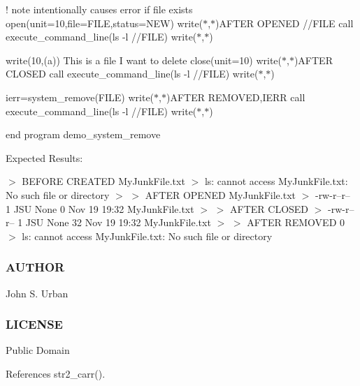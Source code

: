 ! note intentionally causes error if file exists open(unit=10,file=F\+I\+LE,status=\textquotesingle{}N\+EW\textquotesingle{}) write($\ast$,$\ast$)\textquotesingle{}A\+F\+T\+ER O\+P\+E\+N\+ED \textquotesingle{}//\+F\+I\+LE call execute\+\_\+command\+\_\+line(\textquotesingle{}ls -\/l \textquotesingle{}//\+F\+I\+LE) write($\ast$,$\ast$)

write(10,\textquotesingle{}(a)\textquotesingle{}) \textquotesingle{}This is a file I want to delete\textquotesingle{} close(unit=10) write($\ast$,$\ast$)\textquotesingle{}A\+F\+T\+ER C\+L\+O\+S\+ED \textquotesingle{} call execute\+\_\+command\+\_\+line(\textquotesingle{}ls -\/l \textquotesingle{}//\+F\+I\+LE) write($\ast$,$\ast$)

ierr=system\+\_\+remove(\+F\+I\+L\+E) write($\ast$,$\ast$)\textquotesingle{}A\+F\+T\+ER R\+E\+M\+O\+V\+ED\textquotesingle{},I\+E\+RR call execute\+\_\+command\+\_\+line(\textquotesingle{}ls -\/l \textquotesingle{}//\+F\+I\+LE) write($\ast$,$\ast$)

end program demo\+\_\+system\+\_\+remove

Expected Results\+:

$>$ B\+E\+F\+O\+RE C\+R\+E\+A\+T\+ED My\+Junk\+File.\+txt $>$ ls\+: cannot access \textquotesingle{}My\+Junk\+File.\+txt\textquotesingle{}\+: No such file or directory $>$ $>$ A\+F\+T\+ER O\+P\+E\+N\+ED My\+Junk\+File.\+txt $>$ -\/rw-\/r--r-- 1 J\+SU None 0 Nov 19 19\+:32 My\+Junk\+File.\+txt $>$ $>$ A\+F\+T\+ER C\+L\+O\+S\+ED $>$ -\/rw-\/r--r-- 1 J\+SU None 32 Nov 19 19\+:32 My\+Junk\+File.\+txt $>$ $>$ A\+F\+T\+ER R\+E\+M\+O\+V\+ED 0 $>$ ls\+: cannot access \textquotesingle{}My\+Junk\+File.\+txt\textquotesingle{}\+: No such file or directory

\subsubsection*{A\+U\+T\+H\+OR}

John S. Urban \subsubsection*{L\+I\+C\+E\+N\+SE}

Public Domain 

References str2\+\_\+carr().

